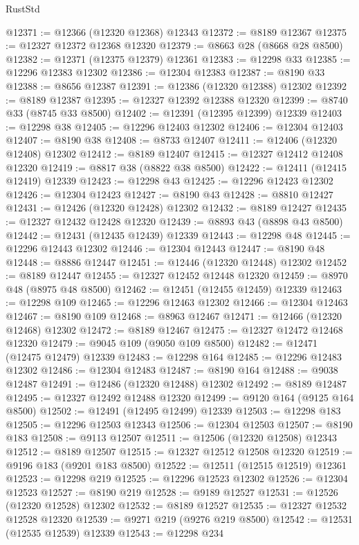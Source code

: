 \begin{lexlean}{RustStd}
\begin{coremodule}
@12371 := @12366 (@12320 @12368) @12343
@12372 := @8189 @12367
@12375 := @12327 @12372 @12368 @12320
@12379 := @8663 @28 (@8668 @28 @8500)
@12382 := @12371 (@12375 @12379) @12361
@12383 := @12298 @33
@12385 := @12296 @12383 @12302
@12386 := @12304 @12383
@12387 := @8190 @33
@12388 := @8656 @12387
@12391 := @12386 (@12320 @12388) @12302
@12392 := @8189 @12387
@12395 := @12327 @12392 @12388 @12320
@12399 := @8740 @33 (@8745 @33 @8500)
@12402 := @12391 (@12395 @12399) @12339
@12403 := @12298 @38
@12405 := @12296 @12403 @12302
@12406 := @12304 @12403
@12407 := @8190 @38
@12408 := @8733 @12407
@12411 := @12406 (@12320 @12408) @12302
@12412 := @8189 @12407
@12415 := @12327 @12412 @12408 @12320
@12419 := @8817 @38 (@8822 @38 @8500)
@12422 := @12411 (@12415 @12419) @12339
@12423 := @12298 @43
@12425 := @12296 @12423 @12302
@12426 := @12304 @12423
@12427 := @8190 @43
@12428 := @8810 @12427
@12431 := @12426 (@12320 @12428) @12302
@12432 := @8189 @12427
@12435 := @12327 @12432 @12428 @12320
@12439 := @8893 @43 (@8898 @43 @8500)
@12442 := @12431 (@12435 @12439) @12339
@12443 := @12298 @48
@12445 := @12296 @12443 @12302
@12446 := @12304 @12443
@12447 := @8190 @48
@12448 := @8886 @12447
@12451 := @12446 (@12320 @12448) @12302
@12452 := @8189 @12447
@12455 := @12327 @12452 @12448 @12320
@12459 := @8970 @48 (@8975 @48 @8500)
@12462 := @12451 (@12455 @12459) @12339
@12463 := @12298 @109
@12465 := @12296 @12463 @12302
@12466 := @12304 @12463
@12467 := @8190 @109
@12468 := @8963 @12467
@12471 := @12466 (@12320 @12468) @12302
@12472 := @8189 @12467
@12475 := @12327 @12472 @12468 @12320
@12479 := @9045 @109 (@9050 @109 @8500)
@12482 := @12471 (@12475 @12479) @12339
@12483 := @12298 @164
@12485 := @12296 @12483 @12302
@12486 := @12304 @12483
@12487 := @8190 @164
@12488 := @9038 @12487
@12491 := @12486 (@12320 @12488) @12302
@12492 := @8189 @12487
@12495 := @12327 @12492 @12488 @12320
@12499 := @9120 @164 (@9125 @164 @8500)
@12502 := @12491 (@12495 @12499) @12339
@12503 := @12298 @183
@12505 := @12296 @12503 @12343
@12506 := @12304 @12503
@12507 := @8190 @183
@12508 := @9113 @12507
@12511 := @12506 (@12320 @12508) @12343
@12512 := @8189 @12507
@12515 := @12327 @12512 @12508 @12320
@12519 := @9196 @183 (@9201 @183 @8500)
@12522 := @12511 (@12515 @12519) @12361
@12523 := @12298 @219
@12525 := @12296 @12523 @12302
@12526 := @12304 @12523
@12527 := @8190 @219
@12528 := @9189 @12527
@12531 := @12526 (@12320 @12528) @12302
@12532 := @8189 @12527
@12535 := @12327 @12532 @12528 @12320
@12539 := @9271 @219 (@9276 @219 @8500)
@12542 := @12531 (@12535 @12539) @12339
@12543 := @12298 @234

\end{coremodule}
\end{lexlean}
